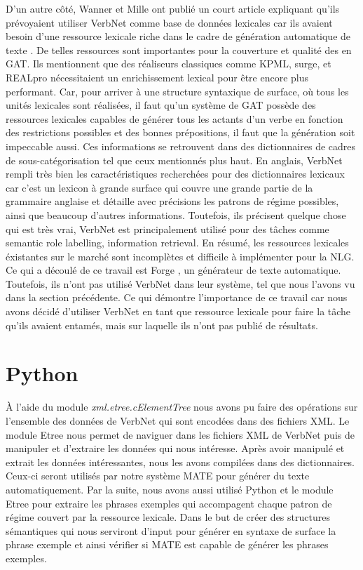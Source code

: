 D'un autre côté, Wanner et Mille ont publié un court article expliquant qu'ils prévoyaient utiliser VerbNet comme base de données lexicales car ils avaient besoin d'une ressource lexicale riche dans le cadre de génération automatique de texte \citep{MilleLargeCoverageDetailed2015}. De telles ressources sont importantes pour la couverture et qualité des en GAT. Ils mentionnent que des réaliseurs classiques comme KPML, surge, et REALpro  nécessitaient un enrichissement lexical pour être encore plus performant. Car, pour arriver à une structure syntaxique de surface, où tous les unités lexicales sont réalisées, il faut qu'un système de GAT possède des ressources lexicales capables de générer tous les actants d'un verbe en fonction des restrictions possibles et des bonnes prépositions, il faut que la génération soit impeccable aussi. Ces informations se retrouvent dans des dictionnaires de cadres de sous-catégorisation tel que ceux mentionnés plus haut. En anglais, VerbNet rempli très bien les caractéristiques recherchées pour des dictionnaires lexicaux car c'est un lexicon à grande surface qui couvre une grande partie de la grammaire anglaise et détaille avec précisions les patrons de régime possibles, ainsi que beaucoup d'autres informations. Toutefois, ils précisent quelque chose qui est très vrai, VerbNet est principalement utilisé pour des tâches comme semantic role labelling, information retrieval. En résumé, les ressources lexicales éxistantes sur le marché sont incomplètes et difficile à implémenter pour la NLG. Ce qui a découlé de ce travail est Forge \citep{DBLP:conf/semeval/MilleCBW17}, un générateur de texte automatique. Toutefois, ils n'ont pas utilisé VerbNet dans leur système, tel que nous l'avons vu dans la section précédente. Ce qui démontre l'importance de ce travail car nous avons décidé d'utiliser VerbNet en tant que ressource lexicale pour faire la tâche qu'ils avaient entamés, mais sur laquelle ils n'ont pas publié de résultats.
 


\section{Python}

À l'aide du module \emph{xml.etree.cElementTree} nous avons pu faire des opérations sur l'ensemble des données de VerbNet qui sont encodées dans des fichiers XML. Le module Etree nous permet de naviguer dans les fichiers XML de VerbNet puis de manipuler et d'extraire les données qui nous intéresse. Après avoir manipulé et extrait les données intéressantes, nous les avons compilées dans des dictionnaires. Ceux-ci seront utilisés par notre système MATE pour générer du texte automatiquement. Par la suite, nous avons aussi utilisé Python et le module Etree pour extraire les phrases exemples qui accompagent chaque patron de régime couvert par la ressource lexicale. Dans le but de créer des structures sémantiques qui nous serviront d'input pour générer en syntaxe de surface la phrase exemple et ainsi vérifier si MATE est capable de générer les phrases exemples.

